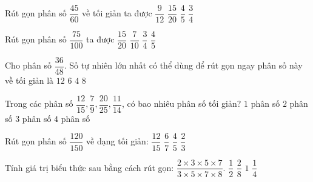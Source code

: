 \begin{ex} %
Rút gọn phân số $\dfrac{45}{60}$ về tối giản ta được
\choice
{$\dfrac{9}{12}$}
{$\dfrac{15}{20}$}
{$\dfrac{4}{5}$}
{\True $\dfrac{3}{4}$}
\end{ex}

\begin{ex} %
Rút gọn phân số $\dfrac{75}{100}$ ta được
\choice
{$\dfrac{15}{20}$}
{$\dfrac{7}{10}$}
{\True $\dfrac{3}{4}$}
{$\dfrac{4}{5}$}
\end{ex}

\begin{ex} %
Cho phân số $\dfrac{36}{48}$. Số tự nhiên lớn nhất có thể dùng để rút gọn ngay phân số này về tối giản là
\choice
{\True $12$}
{$6$}
{$4$}
{$8$}
\end{ex}

\begin{ex} %
Trong các phân số $\dfrac{12}{15}, \dfrac{7}{9}, \dfrac{20}{25}, \dfrac{11}{14}$, có bao nhiêu phân số tối giản?
\choice
{$1$ phân số}
{\True $2$ phân số}
{$3$ phân số}
{$4$ phân số}
\end{ex}

\begin{ex} %
Rút gọn phân số $\dfrac{120}{150}$ về dạng tối giản:
\choice
{$\dfrac{12}{15}$}
{$\dfrac{6}{7}$}
{\True $\dfrac{4}{5}$}
{$\dfrac{2}{3}$}
\end{ex}

\begin{ex} %
Tính giá trị biểu thức sau bằng cách rút gọn: $\dfrac{2 \times 3 \times 5 \times 7}{3 \times 5 \times 7 \times 8}$.
\choice
{$\dfrac{1}{2}$}
{$\dfrac{2}{8}$}
{$1$}
{\True $\dfrac{1}{4}$}
\end{ex}

